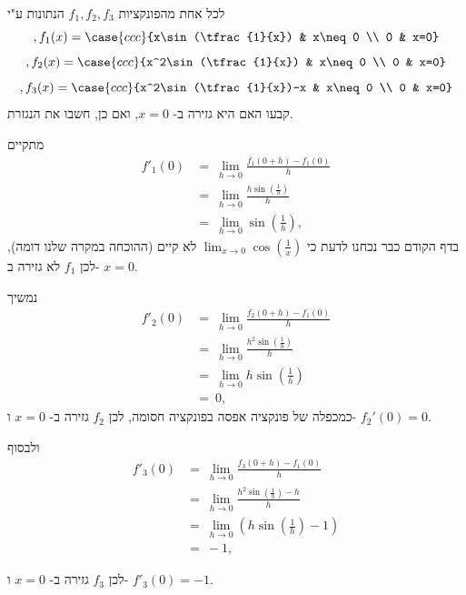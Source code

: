 לכל אחת מהפונקציות
$f_1,f_2,f_3$
הנתונות ע"י
$$,f_1(x)=\case{ccc}{x\sin(\tfrac{1}{x}) & x\neq 0 \\ 0 & x=0}$$
$$,f_2(x)=\case{ccc}{x^2\sin(\tfrac{1}{x}) & x\neq 0 \\ 0 & x=0}$$
$$,f_3(x)=\case{ccc}{x^2\sin(\tfrac{1}{x})-x & x\neq 0 \\ 0 & x=0}$$
קבעו האם היא גזירה ב-
$x=0$,
ואם כן, חשבו את הנגזרת.

\ifsol
{}
\begin{solbox}
מתקיים
\begin{align*}
    f'_1(0)&=\ \lim_{h\to 0}\frac{f_1(0+h)-f_1(0)}{h}\\&=\ \lim_{h\to 0}\frac{h\sin(\tfrac{1}{h})}{h}\\
    &=\ \lim_{h\to 0}\sin(\tfrac{1}{h}),
\end{align*}
בדף הקודם כבר נכחנו לדעת כי
$\displaystyle\lim_{x\to 0}\cos(\tfrac{1}{x})$
לא קיים
(ההוכחה במקרה שלנו דומה),
לכן
$f_1$
לא גזירה ב-
$x=0$.

נמשיך
\begin{align*}
    f'_2(0)&=\ \lim_{h\to 0}\frac{f_2(0+h)-f_1(0)}{h}\\&=\ \lim_{h\to 0}\frac{h^2\sin(\tfrac{1}{h})}{h}\\
    &=\ \lim_{h\to 0}h\sin(\tfrac{1}{h})\\
    &=\ 0,
\end{align*}
כמכפלה של פונקציה אפסה בפונקציה חסומה,
לכן
$f_2$
גזירה ב-
$x=0$
ו-
$f_2'(0)=0$.

ולבסוף
\begin{align*}
    f'_3(0)&=\ \lim_{h\to 0}\frac{f_3(0+h)-f_1(0)}{h}\\&=\ \lim_{h\to 0}\frac{h^2\sin(\tfrac{1}{h})-h}{h}\\
    &=\ \lim_{h\to 0}\left(h\sin(\tfrac{1}{h})-1\right)\\
    &=\ -1,
\end{align*}

לכן
$f_3$
גזירה ב-
$x=0$
ו-
$f'_3(0)=-1$.
\end{solbox}
\fi
